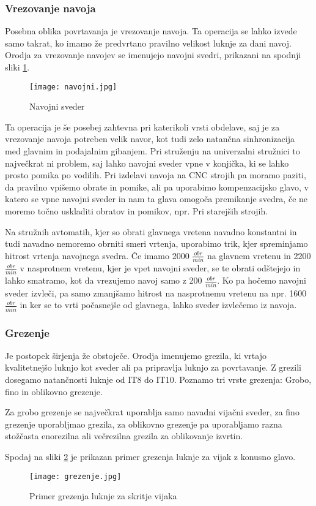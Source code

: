 \subsubsection{Vrezovanje navoja}
Posebna oblika povrtavanja je vrezovanje navoja. Ta operacija se
lahko izvede samo takrat, ko imamo že predvrtano pravilno
velikost luknje za dani navoj. Orodja za vrezovanje navojev se
imenujejo navojni svedri, prikazani na spodnji sliki \ref{navojni_sveder}.
\begin{figure}[H]
	\begin{center}
		\texttt{[image: navojni.jpg]}
		\caption{Navojni sveder
			\cite{sts_arhiv}}
		\label{navojni_sveder}
	\end{center}
\end{figure}
Ta operacija je še posebej zahtevna pri katerikoli vrsti obdelave,
saj je za vrezovanje navoja potreben velik navor, kot tudi zelo natančna
sinhronizacija med glavnim in podajalnim gibanjem. Pri struženju
na univerzalni stružnici to največkrat ni problem, saj lahko navojni
sveder vpne v konjička, ki se lahko prosto pomika po vodilih.
Pri izdelavi navoja na CNC strojih pa moramo paziti, da pravilno vpišemo
obrate in pomike, ali pa uporabimo kompenzacijsko glavo, v katero se
vpne navojni sveder in nam ta glava omogoča premikanje svedra, če
ne moremo točno uskladiti obratov in pomikov, npr. Pri starejših
strojih.

Na stružnih avtomatih, kjer so obrati glavnega vretena navadno konstantni
in tudi navadno nemoremo obrniti smeri vrtenja, uporabimo trik, kjer
spreminjamo hitrost vrtenja navojnega svedra. Če imamo 2000 \(\frac{obr}{min}\)
na glavnem vretenu in 2200 \(\frac{obr}{min}\) v nasprotnem vretenu, kjer je
vpet navojni sveder, se te obrati odštejejo in lahko smatramo, kot da vrezujemo
navoj samo z 200 \(\frac{obr}{min}\). Ko pa hočemo navojni sveder izvleči, pa samo
zmanjšamo hitrost na nasprotnemu vretenu na npr. 1600 \(\frac{obr}{min}\)
in ker se to vrti počasnejše od glavnega, lahko sveder izvlečemo iz navoja.

\subsubsection{Grezenje}
Je postopek širjenja že obstoječe. Orodja imenujemo grezila,
ki vrtajo kvalitetnejšo luknjo kot sveder ali pa pripravlja
luknjo za povrtavanje. Z grezili dosegamo natančnosti luknje od
IT8 do IT10. Poznamo tri vrste grezenja: Grobo, fino in oblikovno grezenje.

Za grobo grezenje se največkrat uporablja samo navadni vijačni
sveder, za fino grezenje uporabljmao grezila, za oblikovno grezenje
pa uporabljamo razna stožčasta enorezilna ali večrezilna grezila
za oblikovanje izvrtin.

Spodaj na sliki \ref{grezilo} je prikazan primer grezenja
luknje za vijak z konusno glavo.

\begin{figure}[H]
	\begin{center}
		\texttt{[image: grezenje.jpg]}
		\caption{Primer grezenja luknje za skritje vijaka
			\cite{sts_arhiv_grezenje}}
		\label{grezilo}
	\end{center}
\end{figure}